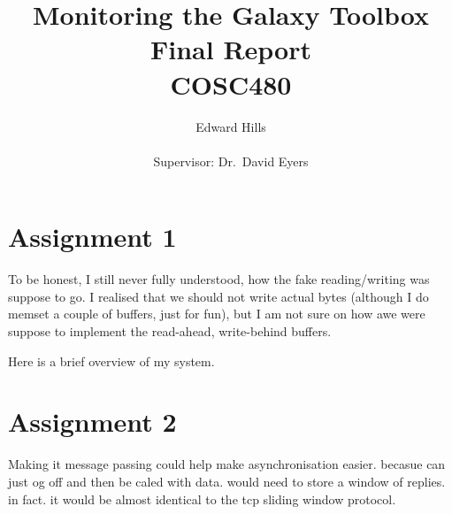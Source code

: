 \documentclass[12pt]{article}
\title{Monitoring the Galaxy Toolbox \\ Final Report \\ COSC480}
\author{Edward Hills \\ \\ Supervisor: Dr.\ David Eyers}
\begin{document}
\vspace{-1cm}

\maketitle

\section{Assignment 1}

To be honest, I still never fully understood, how the fake reading/writing was suppose to go. I realised that we should not write actual bytes (although I do memset a couple of buffers, just for fun), but I am not sure on how awe were suppose to implement the read-ahead, write-behind buffers.

Here is a brief overview of my system.

\section{Assignment 2}

Making it message passing could help make asynchronisation easier. becasue can just og off and then be caled with data. would need to store a window of replies. in fact. it would be almost identical to the tcp sliding window protocol.
\end{document}
